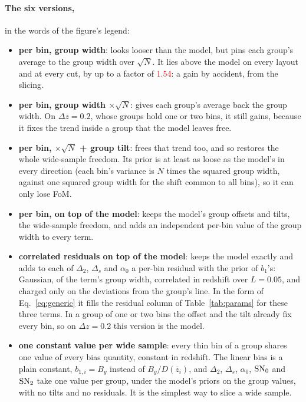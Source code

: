 \documentclass[11pt]{article}
\newcommand{\SNz}{{\rm SN}_0}
\newcommand{\SNt}{{\rm SN}_2}
\newif\ifnumbersfinal
\newcommand{\refresh}[1]{\ifnumbersfinal#1\else\textcolor{red}{#1}\fi}
\newcommand{\UntieGainMax}{\refresh{1.54}}
\newcommand{\LcorrHO}{0.05}
\begin{document}
\paragraph{The six versions,} in the words of the figure's legend:
\begin{itemize}
  \item \textbf{per bin, group width}: looks looser than the model, but
    pins each group's average to the group width over $\sqrt{N}$.  It
    lies above the model on every layout and at every cut, by up to a
    factor of \UntieGainMax{}: a gain by accident, from the slicing.
  \item \textbf{per bin, group width $\times\sqrt{N}$}: gives each
    group's average back the group width.  On $\Delta z = 0.2$, whose
    groups hold one or two bins, it still gains, because it fixes the
    trend inside a group that the model leaves free.
  \item \textbf{per bin, $\times\sqrt{N}$ + group tilt}: frees that
    trend too, and so restores the whole wide-sample freedom.  Its
    prior is at least as loose as the model's in every direction (each
    bin's variance is $N$ times the squared group width, against one
    squared group width for the shift common to all bins), so it can
    only lose FoM.
  \item \textbf{per bin, on top of the model}: keeps the model's group
    offsets and tilts, the wide-sample freedom, and adds an independent
    per-bin value of the group width to every term.
  \item \textbf{correlated residuals on top of the model}: keeps the
    model exactly and adds to each of $\Delta_2$, $\Delta_s$ and
    $\alpha_0$ a per-bin residual with the prior of
    $b_1$'s: Gaussian, of the term's group width, correlated in redshift
    over $L = \LcorrHO$, and charged only on the deviations from the
    group's line.  In the form of Eq.~\eqref{eq:generic} it fills the
    residual column of Table~\ref{tab:params} for these three terms.  In
    a group of one or two bins the offset and the tilt already fix
    every bin, so on $\Delta z = 0.2$ this version is the model.
  \item \textbf{one constant value per wide sample}: every thin bin of
    a group shares one value of every bias quantity, constant in
    redshift.  The linear bias is a plain constant, $b_{1,i} = B_g$
    instead of $B_g/D(\bar{z}_i)$, and $\Delta_2$, $\Delta_s$,
    $\alpha_0$, $\SNz$ and $\SNt$ take one value per group,
    under the model's priors on the group values, with no tilts and no
    residuals.  It is the simplest way to slice a wide sample.
\end{itemize}
\end{document}

